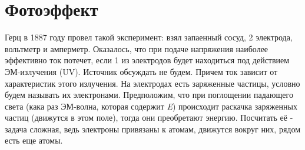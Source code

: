 \newpage
\chapter{Фотоэффект}
\par Герц в 1887 году провел такой эксперимент: взял запаенный сосуд, 2 электрода, вольтметр и амперметр. Оказалось, что при подаче напряжения наиболее эффективно ток потечет, если 1 из электродов будет находиться под действием  ЭМ-излучения (UV). Источник обсуждать не будем. Причем ток зависит от характеристик этого излучения. На электродах есть заряженные частицы, условно будем называть их электронами. Предположим, что при поглощении падающего света (кака раз ЭМ-волна, которая содержит \textit{E}) происходит раскачка заряженных частиц (движутся в этом поле), тогда они преобретают энергию. Посчитать её - задача сложная, ведь электроны привязаны к атомам, движутся вокруг них, рядом есть еще атомы.

